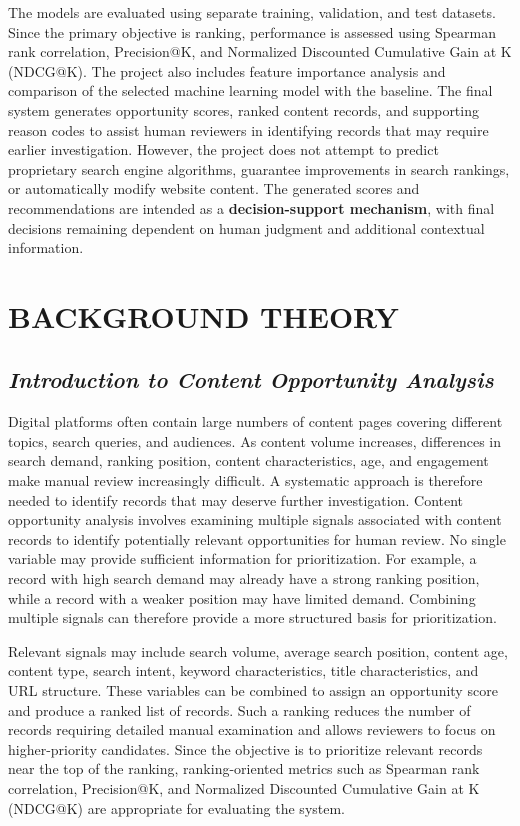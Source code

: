 \documentclass[12pt,a4paper]{report}
\begin{document}
The models are evaluated using separate training, validation, and test datasets. Since the primary objective is ranking, performance is assessed using Spearman rank correlation, Precision@K, and Normalized Discounted Cumulative Gain at K (NDCG@K). The project also includes feature importance analysis and comparison of the selected machine learning model with the baseline. The final system generates opportunity scores, ranked content records, and supporting reason codes to assist human reviewers in identifying records that may require earlier investigation. However, the project does not attempt to predict proprietary search engine algorithms, guarantee improvements in search rankings, or automatically modify website content. The generated scores and recommendations are intended as a \textbf{decision-support mechanism}, with final decisions remaining dependent on human judgment and additional contextual information.

\chapter{BACKGROUND THEORY}

\section{\textit{Introduction to Content Opportunity Analysis}}
Digital platforms often contain large numbers of content pages covering different topics, search queries, and audiences. As content volume increases, differences in search demand, ranking position, content characteristics, age, and engagement make manual review increasingly difficult. A systematic approach is therefore needed to identify records that may deserve further investigation. Content opportunity analysis involves examining multiple signals associated with content records to identify potentially relevant opportunities for human review. No single variable may provide sufficient information for prioritization. For example, a record with high search demand may already have a strong ranking position, while a record with a weaker position may have limited demand. Combining multiple signals can therefore provide a more structured basis for prioritization.

Relevant signals may include search volume, average search position, content age, content type, search intent, keyword characteristics, title characteristics, and URL structure. These variables can be combined to assign an opportunity score and produce a ranked list of records. Such a ranking reduces the number of records requiring detailed manual examination and allows reviewers to focus on higher-priority candidates. Since the objective is to prioritize relevant records near the top of the ranking, ranking-oriented metrics such as Spearman rank correlation, Precision@K, and Normalized Discounted Cumulative Gain at K (NDCG@K) are appropriate for evaluating the system.
\end{document}
